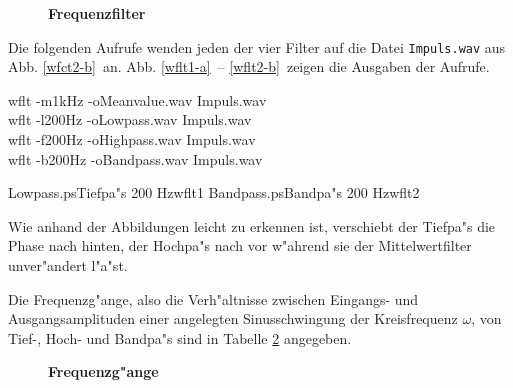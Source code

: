 \begin{figure}[hbt]\label{tab1}\small\centerline{}
\small\caption{\bf Frequenzfilter}
\end{figure}

Die folgenden Aufrufe wenden jeden der vier Filter auf die Datei {\tt Impuls.wav}
aus Abb. \ref{wfct2-b}\ an. Abb. \ref{wflt1-a}\ -- \ref{wflt2-b}\ zeigen
die Ausgaben der Aufrufe.

{\btxt
   wflt -m1kHz -oMeanvalue.wav Impuls.wav  \\
   wflt -l200Hz -oLowpass.wav Impuls.wav    \\
   wflt -f200Hz -oHighpass.wav Impuls.wav   \\
   wflt -b200Hz -oBandpass.wav Impuls.wav   
\etxt}

       {Lowpass.ps}{Tiefpa"s 200 Hz}{wflt1}
       {Bandpass.ps}{Bandpa"s 200 Hz}{wflt2}

Wie anhand der Abbildungen leicht zu erkennen ist, verschiebt der
Tiefpa"s die Phase nach hinten, der Hochpa"s nach vor w"ahrend sie
der Mittelwertfilter unver"andert l"a"st. 

Die Frequenzg"ange, also die Verh"altnisse zwischen Eingangs- und
Ausgangsamplituden einer angelegten Sinusschwingung der Kreisfrequenz 
$\omega$, von Tief-, Hoch- und Bandpa"s sind in Tabelle 
\ref{tab2} angegeben. 

\begin{figure}[hbt]\label{tab2}\centerline{}
\small\caption{\bf Frequenzg"ange}
\end{figure}

